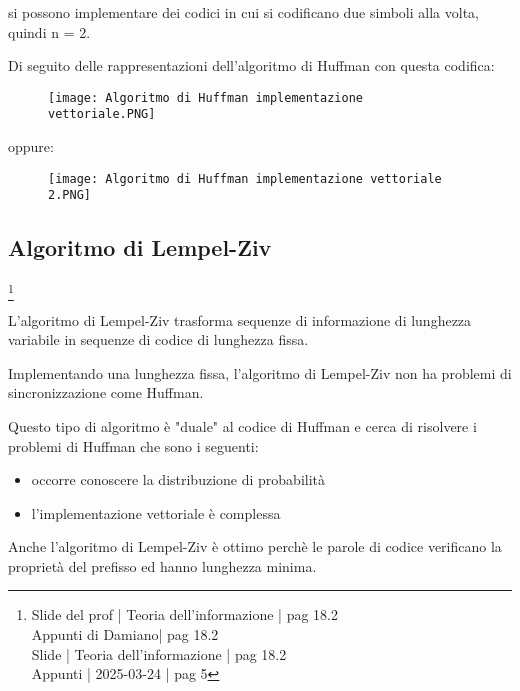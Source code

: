 si possono implementare dei codici in cui si codificano due simboli alla volta, quindi n = 2. \newline 

\newpage 

Di seguito delle rappresentazioni dell'algoritmo di Huffman con questa codifica: 

\begin{figure}[h]
    \centering
    \texttt{[image: Algoritmo di Huffman implementazione vettoriale.PNG]}
\end{figure} 

oppure: 

\begin{figure}[h]
    \centering
    \texttt{[image: Algoritmo di Huffman implementazione vettoriale 2.PNG]}
\end{figure} 

\newpage 

\subsection{Algoritmo di Lempel-Ziv}
\footnote{Slide del prof | Teoria dell'informazione | pag 18.2 \\  
Appunti di Damiano| pag 18.2 \\
Slide | Teoria dell'informazione | pag 18.2 \\
Appunti | 2025-03-24 | pag 5
}

L'algoritmo di Lempel-Ziv trasforma sequenze di informazione di lunghezza variabile in sequenze di codice di lunghezza fissa. \newline 

Implementando una lunghezza fissa, l'algoritmo di Lempel-Ziv non ha problemi di sincronizzazione come Huffman. \newline 

Questo tipo di algoritmo è "duale" al codice di Huffman e cerca di risolvere i problemi di Huffman che sono i seguenti: 

\begin{itemize}
    \item occorre conoscere la distribuzione di probabilità 
    \item l'implementazione vettoriale è complessa
\end{itemize}

Anche l'algoritmo di Lempel-Ziv è ottimo perchè le parole di codice verificano la proprietà del prefisso ed hanno lunghezza minima. \newline 

